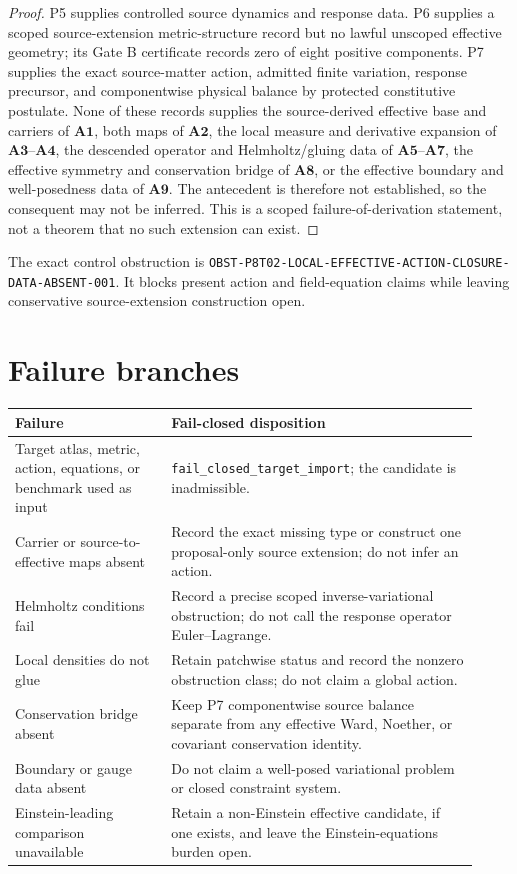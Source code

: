 \documentclass[11pt]{article}
\begin{document}
\begin{proof}
P5 supplies controlled source dynamics and response data.  P6 supplies a
scoped source-extension metric-structure record but no lawful unscoped
effective geometry; its Gate B certificate records zero of eight positive
components.  P7 supplies the exact source-matter action, admitted finite
variation, response precursor, and componentwise physical balance by
protected constitutive postulate.  None of these records supplies the
source-derived effective base and carriers of \(\mathbf{A1}\), both maps of
\(\mathbf{A2}\), the local measure and derivative expansion of
\(\mathbf{A3}\)--\(\mathbf{A4}\), the descended operator and Helmholtz/gluing
data of \(\mathbf{A5}\)--\(\mathbf{A7}\), the effective symmetry and
conservation bridge of \(\mathbf{A8}\), or the effective boundary and
well-posedness data of \(\mathbf{A9}\).  The antecedent is therefore not
established, so the consequent may not be inferred.  This is a scoped
failure-of-derivation statement, not a theorem that no such extension can
exist.
\end{proof}

The exact control obstruction is
\texttt{OBST-P8T02-LOCAL-EFFECTIVE-ACTION-CLOSURE-DATA-ABSENT-001}.
It blocks present action and field-equation claims while leaving conservative
source-extension construction open.

\section{Failure branches}

\begin{longtable}{p{0.31\linewidth}p{0.61\linewidth}}
\toprule
Failure & Fail-closed disposition\\
\midrule
Target atlas, metric, action, equations, or benchmark used as input &
\texttt{fail\_closed\_target\_import}; the candidate is inadmissible.\\
Carrier or source-to-effective maps absent &
Record the exact missing type or construct one proposal-only source extension;
do not infer an action.\\
Helmholtz conditions fail &
Record a precise scoped inverse-variational obstruction; do not call the
response operator Euler--Lagrange.\\
Local densities do not glue &
Retain patchwise status and record the nonzero obstruction class; do not claim
a global action.\\
Conservation bridge absent &
Keep P7 componentwise source balance separate from any effective Ward,
Noether, or covariant conservation identity.\\
Boundary or gauge data absent &
Do not claim a well-posed variational problem or closed constraint system.\\
Einstein-leading comparison unavailable &
Retain a non-Einstein effective candidate, if one exists, and leave the
Einstein-equations burden open.\\
\bottomrule
\end{longtable}
\end{document}
